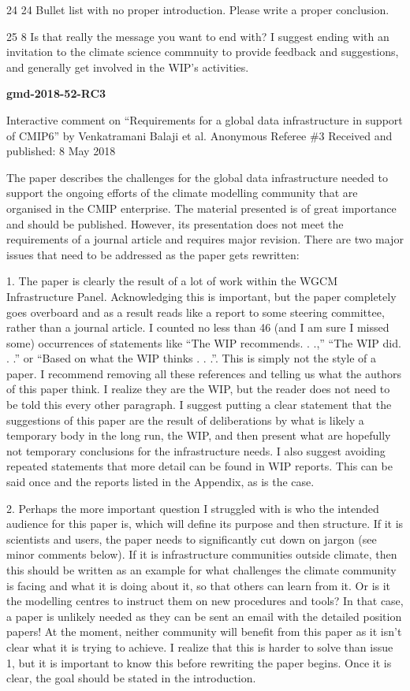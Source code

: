 \documentclass[gmd,manuscript]{copernicus}
\begin{document}
24 24 Bullet list with no proper introduction. Please write a proper
conclusion.

25 8 Is that really the message you want to end with? I suggest ending
with an invitation to the climate science commnuity to provide
feedback and suggestions, and generally get involved in the WIP’s
activities.

\pagebreak


\textbf{gmd-2018-52-RC3}

Interactive comment on “Requirements for a
global data infrastructure in support of CMIP6” by
Venkatramani Balaji et al.
Anonymous Referee \#3
Received and published: 8 May 2018

The paper describes the challenges for the global data infrastructure
needed to support the ongoing efforts of the climate modelling
community that are organised in the CMIP enterprise. The material
presented is of great importance and should be published. However, its
presentation does not meet the requirements of a journal article and
requires major revision. There are two major issues that need to be
addressed as the paper gets rewritten:

1. The paper is clearly the result of a lot of work within the WGCM
Infrastructure Panel. Acknowledging this is important, but the paper
completely goes overboard and as a result reads like a report to some
steering committee, rather than a journal article. I counted no less
than 46 (and I am sure I missed some) occurrences of statements like
“The WIP recommends. . .,” “The WIP did. . .” or “Based on what the
WIP thinks . . .”. This is simply not the style of a paper. I
recommend removing all these references and telling us what the
authors of this paper think. I realize they are the WIP, but the
reader does not need to be told this every other paragraph. I suggest
putting a clear statement that the suggestions of this paper are the
result of deliberations by what is likely a temporary body in the long
run, the WIP, and then present what are hopefully not temporary
conclusions for the infrastructure needs. I also suggest avoiding
repeated statements that more detail can be found in WIP reports. This
can be said once and the reports listed in the Appendix, as is the
case.

2. Perhaps the more important question I struggled with is who the
intended audience for this paper is, which will define its purpose and
then structure. If it is scientists and users, the paper needs to
significantly cut down on jargon (see minor comments below). If it is
infrastructure communities outside climate, then this should be
written as an example for what challenges the climate community is
facing and what it is doing about it, so that others can learn from
it. Or is it the modelling centres to instruct them on new procedures
and tools? In that case, a paper is unlikely needed as they can be
sent an email with the detailed position papers! At the moment,
neither community will benefit from this paper as it isn’t clear what
it is trying to achieve. I realize that this is harder to solve than
issue 1, but it is important to know this before rewriting the paper
begins. Once it is clear, the goal should be stated in the
introduction.
\end{document}
